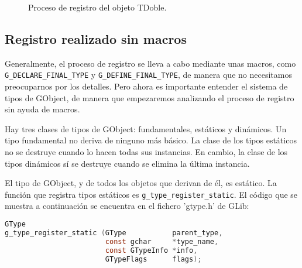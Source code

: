 \begin{figure}[ht]
 \caption{Proceso de registro del objeto \textsf{TDoble}.}
 \label{fig:proceso-registro}
\end{figure}

\subsection{Registro realizado sin macros}
Generalmente, el proceso de registro se lleva a cabo mediante unas macros, como
\texttt{G\_DECLARE\_FINAL\_TYPE} y \texttt{G\_DEFINE\_FINAL\_TYPE}, de manera que no
necesitamos preocuparnos por los detalles. Pero ahora es importante entender el
sistema de tipos de \textsf{GObject}, de manera que empezaremos analizando el proceso
de registro sin ayuda de macros.

Hay tres clases de tipos de \textsf{GObject}: fundamentales, estáticos y dinámicos.
Un tipo fundamental no deriva de ninguno más básico.
La clase de los tipos estáticos no se destruye cuando lo hacen todas sus instancias.
En cambio, la clase de los tipos dinámicos sí se destruye cuando se elimina la última instancia.

El tipo de \textsf{GObject}, y de todos los objetos que derivan de él, es estático.
La función que registra tipos estáticos es \texttt{g\_type\_register\_static}.
El código que se muestra a continuación se encuentra en el fichero '\textsf{gtype.h}' de
\textsf{GLib}:
\begin{lstlisting}[language=C]
GType
g_type_register_static (GType           parent_type,
                        const gchar     *type_name,
                        const GTypeInfo *info,
                        GTypeFlags      flags);
\end{lstlisting}

